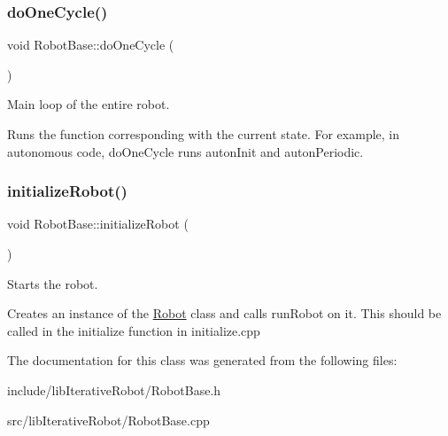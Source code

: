 \subsubsection{\texorpdfstring{doOneCycle()}{doOneCycle()}}
{\footnotesize\ttfamily void Robot\+Base\+::do\+One\+Cycle (\begin{DoxyParamCaption}{ }\end{DoxyParamCaption})\hspace{0.3cm}{\ttfamily [private]}}



Main loop of the entire robot. 

Runs the function corresponding with the current state. For example, in autonomous code, do\+One\+Cycle runs auton\+Init and auton\+Periodic. \mbox{\label{classlib_iterative_robot_1_1_robot_base_aaefe1d1083d84c855750bb8e3d52b0ac}} 
\subsubsection{\texorpdfstring{initializeRobot()}{initializeRobot()}}
{\footnotesize\ttfamily void Robot\+Base\+::initialize\+Robot (\begin{DoxyParamCaption}{ }\end{DoxyParamCaption})\hspace{0.3cm}{\ttfamily [static]}}



Starts the robot. 

Creates an instance of the \mbox{\hyperlink{class_robot}{Robot}} class and calls run\+Robot on it. This should be called in the initialize function in initialize.\+cpp 

The documentation for this class was generated from the following files\+:\begin{DoxyCompactItemize}
\item 
include/lib\+Iterative\+Robot/Robot\+Base.\+h\item 
src/lib\+Iterative\+Robot/Robot\+Base.\+cpp\end{DoxyCompactItemize}
